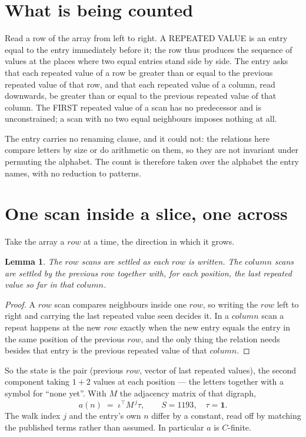 \documentclass[11pt,a4paper]{article}
\theoremstyle{plain}
\newtheorem{lemma}[theorem]{Lemma}
\theoremstyle{definition}
\begin{document}
\section{What is being counted}

Read a row of the array from left to right. A REPEATED VALUE is an entry equal to the entry
immediately before it; the row thus produces the sequence of values at the places where two
equal entries stand side by side. The entry asks that each repeated value of a row be
greater than or equal to the previous repeated value of that row, and that each repeated value of a column,
read downwards, be greater than or equal to the previous repeated value of that column. The FIRST repeated
value of a scan has no predecessor and is unconstrained; a scan with no two equal neighbours
imposes nothing at all.

The entry carries no renaming clause, and it could not: the relations here compare letters by
size or do arithmetic on them, so they are not invariant under permuting the alphabet. The
count is therefore taken over the alphabet the entry names, with no reduction to patterns.

\section{One scan inside a slice, one across}

Take the array a $row$ at a time, the direction in which it grows.

\begin{lemma}\label{lem:state}
The $row$ scans are settled as each $row$ is written. The $column$ scans are
settled by the previous $row$ together with, for each position, the last repeated value
so far in that $column$.
\end{lemma}

\begin{proof}
A $row$ scan compares neighbours inside one $row$, so writing the
$row$ left to right and carrying the last repeated value seen decides it. In a
$column$ scan a repeat happens at the new $row$ exactly when the new entry equals the
entry in the same position of the previous $row$, and the only thing the relation needs
besides that entry is the previous repeated value of that $column$.
\end{proof}

So the state is the pair (previous $row$, vector of last repeated values), the second
component taking $1+2$ values at each position --- the letters together with a symbol for
``none yet''. With $M$ the adjacency matrix of that digraph,
\[
a(n)\;=\;\iota^{\!\top}M^{\,j}\tau ,\qquad S=1193,\quad\tau=\mathbf{1} .
\]
The walk index $j$ and the entry's own $n$ differ by a constant, read off by matching the
published terms rather than assumed. In particular $a$ is $C$-finite.
\end{document}
